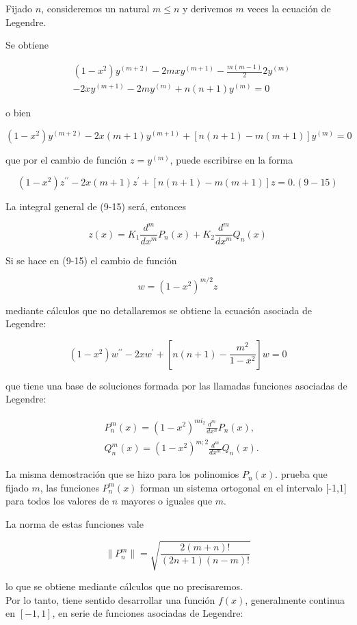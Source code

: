 \documentclass[10pt]{article}
\theoremstyle{plain}
\theoremstyle{definition}
\theoremstyle{remark}
\begin{document}
Fijado $n$, consideremos un natural $m \leqslant n$ y derivemos $m$ veces la ecuación de Legendre.

Se obtiene

$$
\begin{aligned}
& \left(1-x^{2}\right) y^{(m+2)}-2 m x y^{(m+1)}-\frac{m(m-1)}{2} 2 y^{(m)} \\
& -2 x y^{(m+1)}-2 m y^{(m)}+n(n+1) y^{(m)}=0
\end{aligned}
$$

o bien

$$
\left(1-x^{2}\right) y^{(m+2)}-2 x(m+1) y^{(m+1)}+[n(n+1)-m(m+1)] y^{(m)}=0
$$

que por el cambio de función $z=y^{(m)}$, puede escribirse en la forma

$$
\left(1-x^{2}\right) z^{\prime \prime}-2 x(m+1) z^{\prime}+[n(n+1)-m(m+1)] z=0 .(9-15)
$$

La integral general de (9-15) será, entonces

$$
z(x)=K_{1} \frac{d^{m}}{d x^{m}} P_{n}(x)+K_{2} \frac{d^{m}}{d x^{m}} Q_{n}(x)
$$

Si se hace en (9-15) el cambio de función

$$
w=\left(1-x^{2}\right)^{m / 2} z
$$

mediante cálculos que no detallaremos se obtiene la ecuación asociada de Legendre:


$$
\left(1-x^{2}\right) w^{\prime \prime}-2 x w^{\prime}+\left[n(n+1)-\frac{m^{2}}{1-x^{2}}\right] w=0
$$

que tiene una base de soluciones formada por las llamadas funciones asociadas de Legendre:

$$
\begin{aligned}
& P_{n}^{m}(x)=\left(1-x^{2}\right)^{m i_{2}} \frac{d^{m}}{d x^{n}} P_{n}(x), \\
& Q_{n}^{m}(x)=\left(1-x^{2}\right)^{m ; 2} \frac{d^{m}}{d x^{m}} Q_{n}(x) .
\end{aligned}
$$

La misma demostración que se hizo para los polinomios $P_{n}(x)$. prueba que fijado $m$, las funciones $P_{n}^{m}(x)$ forman un sistema ortogonal en el intervalo [-1,1] para todos los valores de $n$ mayores o iguales que $m$.

La norma de estas funciones vale

$$
\left\|P_{n}^{m}\right\|=\sqrt{\frac{2(m+n)!}{(2 n+1)(n-m)!}}
$$

lo que se obtiene mediante cálculos que no precisaremos.\\
Por lo tanto, tiene sentido desarrollar una función $f(x)$, generalmente continua en $[-1,1]$, en serie de funciones asociadas de Legendre:
\end{document}

